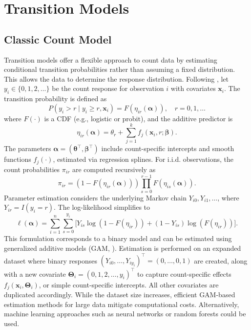 \documentclass[english,a4paper,11pt]{article}
\begin{document}
\section{Transition Models} \label{sec:tm}

\subsection{Classic Count Model} \label{sec:counts}

Transition models offer a flexible approach to count data by estimating conditional
transition probabilities rather than assuming a fixed distribution. This allows the data to
determine the response distribution.
Following \cite{Berger:2021}, let $y_i \in \{0, 1, 2, \dots\}$ be the count response for
observation $i$ with covariates $\mathbf{x}_i$. The transition probability is defined as  
\begin{equation} \label{eqn:tm}
P(y_i > r \mid y_i \geq r, \mathbf{x}_i) = F(\eta_{ir}(\boldsymbol{\alpha})), \quad r = 0, 1, \dots
\end{equation}
where $F(\cdot)$ is a CDF (e.g., logistic or probit), and the additive predictor is  
$$
\eta_{ir}(\boldsymbol{\alpha}) = \theta_r + \sum_{j=1}^k f_j(\mathbf{x}_i, r; \boldsymbol{\beta}).
$$
The parameters $\boldsymbol{\alpha} = (\boldsymbol{\theta}^\top, \boldsymbol{\beta}^\top)$
include count-specific intercepts and smooth functions $f_j(\cdot)$, estimated via regression splines.
For i.i.d. observations, the count probabilities $\pi_{ir}$ are computed recursively as  
$$
\pi_{ir} = (1 - F(\eta_{ir}(\boldsymbol{\alpha}))) \prod_{s=0}^{r-1} F(\eta_{is}(\boldsymbol{\alpha})).
$$
Parameter estimation considers the underlying Markov chain $Y_{i0}, Y_{i1}, \dots$,
where $Y_{ir} = I(y_i = r)$. The log-likelihood simplifies to  
$$
\ell(\boldsymbol{\alpha}) = \sum_{i=1}^n \sum_{s=0}^{y_i} \Big[Y_{is} \log(1 - F(\eta_{ir})) + (1 - Y_{is}) \log(F(\eta_{ir}))\Big].
$$
This formulation corresponds to a binary model and can be estimated using
generalized additive models (GAM, \cite{Wood17}).
Estimation is performed on an expanded dataset where binary responses
$(Y_{i0}, \dots, Y_{iy_i})^\top = (0, \dots, 0, 1)$ are created, along with a new
covariate $\boldsymbol{\Theta}_i = (0, 1, 2, \dots, y_i)^\top$ to capture
count-specific effects $f_j(\mathbf{x}_i, \boldsymbol{\Theta}_i)$, or simple count-specific
intercepts. All other covariates are duplicated accordingly.
While the dataset size increases, efficient GAM-based estimation methods for
large data \cite{Wood:2014, Wood:2017} mitigate computational costs. Alternatively, machine
learning approaches such as neural networks or random forests could be used.
\end{document}
